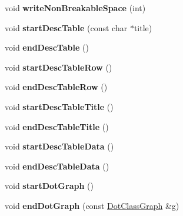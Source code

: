 \begin{DoxyCompactItemize}
void {\bfseries write\+Non\+Breakable\+Space} (int)
\item 
\mbox{\label{class_html_generator_ad238943ff33bd9b0ea5e566f0be9a168}} 
void {\bfseries start\+Desc\+Table} (const char $\ast$title)
\item 
\mbox{\label{class_html_generator_adc3d1eed2818cdd2a01eb1eacc0ad08d}} 
void {\bfseries end\+Desc\+Table} ()
\item 
\mbox{\label{class_html_generator_a203e0dab89c356bf2afdd13ee368e893}} 
void {\bfseries start\+Desc\+Table\+Row} ()
\item 
\mbox{\label{class_html_generator_af9ae96be3611a28b217f788f2e111d63}} 
void {\bfseries end\+Desc\+Table\+Row} ()
\item 
\mbox{\label{class_html_generator_a3513b8c53063d076b85ffb8e0608cd9d}} 
void {\bfseries start\+Desc\+Table\+Title} ()
\item 
\mbox{\label{class_html_generator_ac070a0a291e13f63c3d17294244960d6}} 
void {\bfseries end\+Desc\+Table\+Title} ()
\item 
\mbox{\label{class_html_generator_acf27d538b5edea06a1ec91813ca059fd}} 
void {\bfseries start\+Desc\+Table\+Data} ()
\item 
\mbox{\label{class_html_generator_a20750bdcf48a3104469275333d41f942}} 
void {\bfseries end\+Desc\+Table\+Data} ()
\item 
\mbox{\label{class_html_generator_ab0139c0d7abf7bca982e9d4360b4ed34}} 
void {\bfseries start\+Dot\+Graph} ()
\item 
\mbox{\label{class_html_generator_a58adba1813ebabd879074371cd56819c}} 
void {\bfseries end\+Dot\+Graph} (const \mbox{\hyperlink{class_dot_class_graph}{Dot\+Class\+Graph}} \&g)
\item 
\mbox{\label{class_html_generator_a681694b9fbcedc15903e51c95016f711}} 

\end{DoxyCompactItemize}
